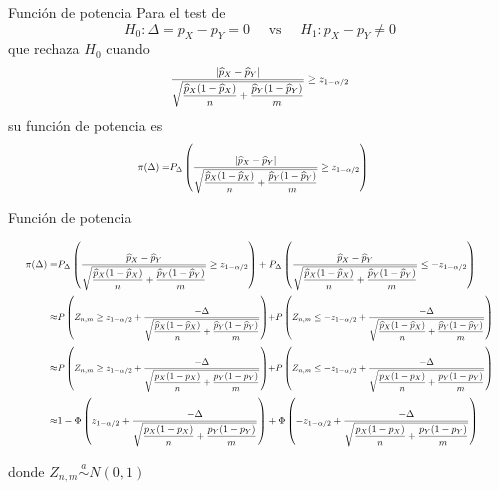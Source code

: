 \documentclass{beamer}
\theoremstyle{definition}
\newcommand\scalemath[2]{\scalebox{#1}{\mbox{\ensuremath{\displaystyle #2}}}}
\begin{document}
\begin{frame}{\color{rosee} Funci\'on de potencia}
\small
Para el test de
$$
H_0: \Delta= p_X-p_Y=0 \quad \text { vs } \quad H_1: p_X-p_Y \neq 0
$$
que rechaza $H_0$ cuando
$$\scalemath{0.75}{
\frac{\left|\widehat{p}_X-\widehat{p}_Y\right|}{\sqrt{\dfrac{\widehat{p}_X(1-\widehat{p}_X)}{n}+
         \dfrac{\widehat{p}_Y(1-\widehat{p}_Y)}{m}}} \geq z_{1-\alpha / 2}}
$$
su funci\'on de potencia es
$$
\begin{aligned}\scalemath{0.7}{
\pi(\Delta)=}& \scalemath{0.7}{P_{\Delta}\left(\frac{\left|\widehat{p}_X-\widehat{p}_Y\right|}{\sqrt{\dfrac{\widehat{p}_X(1-\widehat{p}_X)}{n}+
         \dfrac{\widehat{p}_Y(1-\widehat{p}_Y)}{m}}} \geq z_{1-\alpha / 2}\right)}
\end{aligned}
$$
\end{frame}

\begin{frame}{\color{rosee} Funci\'on de potencia}
\small

$$
\begin{aligned}\scalemath{0.7}{
\pi(\Delta)=}& \scalemath{0.7}{ P_{\Delta}\left(\frac{\widehat{p}_X-\widehat{p}_Y}{\sqrt{\dfrac{\widehat{p}_X(1-\widehat{p}_X)}{n}+
         \dfrac{\widehat{p}_Y(1-\widehat{p}_Y)}{m}}} \geq z_{1-\alpha / 2}\right)+P_{\Delta}\left(\frac{\widehat{p}_X-\widehat{p}_Y}{\sqrt{\dfrac{\widehat{p}_X(1-\widehat{p}_X)}{n}+
         \dfrac{\widehat{p}_Y(1-\widehat{p}_Y)}{m}}} \leq-z_{1-\alpha / 2}\right)} \\
\scalemath{0.7}{\approx} & \scalemath{0.65}{P\left(Z_{n,m} \geq z_{1-\alpha / 2}+\frac{-\Delta}{\sqrt{\dfrac{\widehat{p}_X(1-\widehat{p}_X)}{n}+ \dfrac{\widehat{p}_Y(1-\widehat{p}_Y)}{m}}}\right) } 
\scalemath{0.65}{+P\left(Z_{n,m} \leq-z_{1-\alpha / 2}+\frac{-\Delta}{\sqrt{\dfrac{\widehat{p}_X(1-\widehat{p}_X)}{n}+ \dfrac{\widehat{p}_Y(1-\widehat{p}_Y)}{m}}}\right) } \\ 
        \scalemath{0.7}{\approx} & \scalemath{0.65}{P\left(Z_{n,m} \geq z_{1-\alpha / 2}+\frac{-\Delta}{\sqrt{\dfrac{p_X(1-p_X)}{n}+
         \dfrac{p_Y(1-p_Y)}{m}}}\right)}\scalemath{0.65}{+P\left(Z_{n,m} \leq-z_{1-\alpha / 2}+\frac{-\Delta}{\sqrt{\dfrac{p_X(1-p_X)}{n}+
         \dfrac{p_Y(1-p_Y)}{m}}}\right) } \\
\scalemath{0.7}{\approx}& \scalemath{0.7}{1-\Phi\left(z_{1-\alpha / 2}+\frac{-\Delta}{\sqrt{\dfrac{p_X(1-p_X)}{n}+
         \dfrac{p_Y(1-p_Y)}{m}}}\right)+\Phi\left(-z_{1-\alpha / 2}+\frac{-\Delta}{\sqrt{\dfrac{p_X(1-p_X)}{n}+
         \dfrac{p_Y(1-p_Y)}{m}}}\right)}
\end{aligned}
$$

\noindent donde $Z_{n,m} \stackrel{a}{\sim} N(0,1)$
\end{frame}
\end{document}
